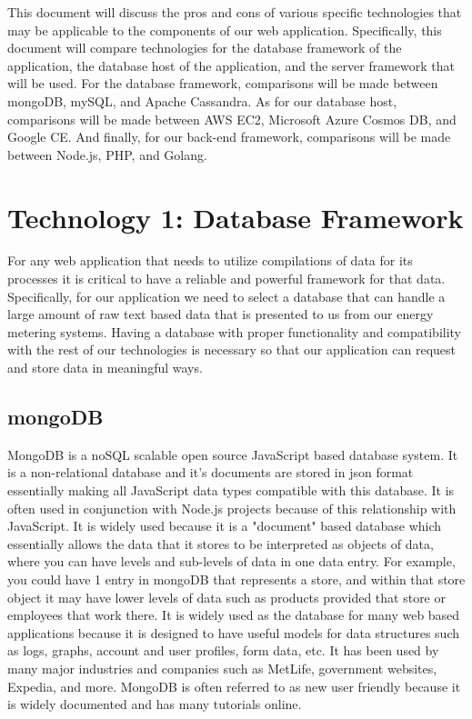 \documentclass[onecolumn, draftclsnofoot,10pt, compsoc]{IEEEtran}
\begin{document}
	This document will discuss the pros and cons of various specific technologies that may be applicable to the components of our web application. Specifically, this
	document will compare technologies for the database framework of the application, the database host of the application, and the server framework that will be used.
	For the database framework, comparisons will be made between mongoDB, mySQL, and Apache Cassandra. As for our database host, comparisons will be made between AWS EC2, Microsoft Azure Cosmos DB, and Google CE.
	And finally, for our back-end framework, comparisons will be made between Node.js, PHP, and Golang.


\section{Technology 1: Database Framework}

	For any web application that needs to utilize compilations of data for its processes it is critical to have a reliable and 
	powerful framework for that data. Specifically, for our application we need to select a database that can handle a large amount
	of raw text based data that is presented to us from our energy metering systems. Having a database with proper functionality and
	compatibility with the rest of our technologies is necessary so that our application can request and store data in meaningful ways. 
	
	\subsection{mongoDB}
	
		MongoDB is a noSQL scalable open source JavaScript based database system. It is a non-relational database and it's documents are stored in json format essentially making all JavaScript data types compatible with this
		database. It is often used in conjunction with Node.js projects because of this relationship with JavaScript. It is widely used because it is a "document" based
		database which essentially allows the data that it stores to be interpreted as objects of data, where you can have levels and sub-levels of data in one data entry.
		For example, you could have 1 entry in mongoDB that represents a store, and within that store object it may have lower levels of data such as products provided that store 
		or employees that work there. It is widely used as the database for many web based applications because it is designed to have useful models for data structures
		such as logs, graphs, account and user profiles, form data, etc. It has been used by many major industries and companies such as MetLife, government websites, Expedia, and more.
		MongoDB is often referred to as new user friendly because it is widely documented and has many tutorials online. 
		
\end{document}
